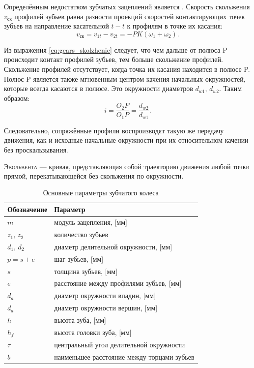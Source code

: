 \documentclass{tufte-book}
\begin{document}
Определённым недостатком зубчатых зацеплений является . Скорость скольжения $ v_\text{ск} $ профилей зубьев равна разности проекций скоростей контактирующих точек зубьев на направление касательной $ t-t $ к профилям в точке их касания: 
\begin{equation}
\label{eq:gears_skolzhenie}
v_\text{ск}=v_{1t} - v_{2t} = -PK (\omega_1 + \omega_2).
\end{equation}

Из выражения \ref{eq:gears_skolzhenie} следует, что чем дальше от полюса P происходит контакт профилей зубьев, тем больше скольжение профилей.
Скольжение профилей отсутствует, когда точка их касания находится в полюсе P. Полюс P является также мгновенным центром качения начальных окружностей, которые всегда касаются в полюсе. Это окружности диаметров $ d_{w1}, \, d_{w2} $. Таким образом:
\begin{equation*}
i=\dfrac{O_2 P}{O_1 P} = \dfrac{d_{w2}}{d_{w1}}.
\end{equation*}

\noindent
Следовательно, сопряжённые профили воспроизводят такую же передачу движения, как и исходные начальные окружности при их относительном качении без проскальзывания.

\textsc{Эвольвента} --- кривая, представляющая собой траекторию движения любой точки прямой, перекатывающейся без скольжения по окружности.

\begin{table}[ht]
	\centering
	\selectfont
	\begin{tabular}{ll}
		\toprule
		Обозначение & Параметр \\ 
		\midrule
		$ m $ & модуль зацепления, [мм] \\
		$ z_1,\,z_2 $ & количество зубьев \\
		$ d_1,\,d_2 $ & диаметр делительной окружности, [мм] \\
		$ p=s+e $ & шаг зубьев, [мм] \\
		$ s $ & толщина зубьев, [мм] \\
		$ e $ & расстояние между профилями зубьев, [мм] \\
		$ d_a $ & диаметр окружности впадин, [мм] \\
		$ d_a $ & диаметр окружности вершин, [мм] \\
		$ h $ & высота зуба, [мм] \\
		$ h_f $ & высота головки зуба, [мм] \\
		$ \tau $ & центральный угол делительной окружности \\
		$ b $ & наименьшее расстояние между торцами зубьев \\
		\bottomrule
	\end{tabular}
	\caption{Основные параметры зубчатого колеса}
	\label{tab:parZ}
\end{table}
\end{document}
